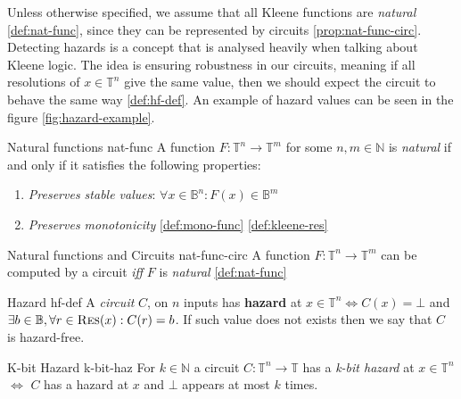 Unless otherwise specified, we assume that all Kleene functions are \textit{natural} \ref{def:nat-func}, since
they can be represented by circuits \ref{prop:nat-func-circ}.
Detecting hazards is a concept that is analysed heavily when talking about Kleene logic.
The idea is ensuring robustness in our circuits, meaning if all resolutions of $x \in \mathbb{T}^n$
give the same value, then we should expect the circuit to behave the same way \ref{def:hf-def}.
An example of hazard values can be seen in the figure \ref{fig:hazard-example}. %


\begin{definitionbox}{Natural functions \cite{ikenmeyer_ComplexityHazardfreeCircuits_2019}}{nat-func}
    A function $F: \mathbb{T}^n \to \mathbb{T}^m$ for some $n, m \in \mathbb{N}$ is \textit{natural} if and only
    if it satisfies the following properties:
    \begin{enumerate}
        \item \textit{Preserves stable values}: $\forall x \in \mathbb{B}^n: F(x) \in \mathbb{B}^m$
        \item \textit{Preserves monotonicity} \ref{def:mono-func} \ref{def:kleene-res}
    \end{enumerate}
\end{definitionbox}

\begin{propositionbox}{Natural functions and Circuits \cite{mukaidono_BternaryLogicFunction_1972,ikenmeyer_ComplexityHazardfreeCircuits_2019}}{nat-func-circ}
    A function $F: \mathbb{T}^n \to \mathbb{T}^m$ can be computed by a circuit \textit{iff} $F$ is \textit{natural} \ref{def:nat-func}
\end{propositionbox}

\begin{definitionbox}{Hazard \cite{ikenmeyer_ComplexityHazardfreeCircuits_2019, eichelberger_HazardDetectionCombinational_1965}}{hf-def}
    A \textit{circuit} $C$, on $n$ inputs has \textbf{hazard} at $x \in \mathbb{T}^n \iff C(x) = \bot$
    and $\exists b \in \mathbb{B}, \forall r \in \textnormal{\textsc{Res}}(x): C(r) = b$. If such value does not exists
    then we say that $C$ is hazard-free.
\end{definitionbox}


\begin{definitionbox}{K-bit Hazard \cite{ikenmeyer_ComplexityHazardfreeCircuits_2019}}{k-bit-haz}
    For $k \in \mathbb{N}$ a circuit $C: \mathbb{T}^n \to \mathbb{T}$ has a \textit{k-bit hazard} at $x \in \mathbb{T}^n$
    $\iff$ $C$ has a hazard at $x$ and $\bot$ appears at most $k$ times.
\end{definitionbox}


